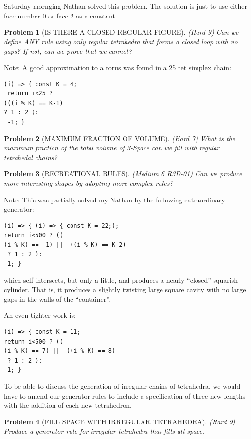 \documentclass[11pt]{article}
\newtheorem{problem}{Problem}
\begin{document}
Saturday mornging Nathan solved this problem. The solution is just to use either face number $0$ or face $2$ as a constant.

\begin{problem}[IS THERE A CLOSED REGULAR FIGURE]
(Hard 9) Can we define ANY rule using only regular tetrahedra that forms a closed loop with no gaps? If not, can we prove that we cannot?  
\end{problem}

Note: A good approximation to a torus was found in a 25 tet simplex chain:
\begin{verbatim}
(i) => { const K = 4;
 return i<25 ? 
(((i % K) == K-1) 
? 1 : 2 ):
 -1; }
\end{verbatim}


\begin{problem}[MAXIMUM FRACTION OF VOLUME]
(Hard 7) What is the maximum fraction of the total volume of 3-Space can we fill with regular tetrahedal chains?
\end{problem}

\begin{problem}[RECREATIONAL RULES]
(Medium 6 R3D-01) Can we produce more interesting shapes by adopting more complex rules?  
\end{problem}

Note: This was partially solved my Nathan by the following extraordinary generator:
\begin{verbatim}
(i) => { (i) => { const K = 22;);
return i<500 ? ((
(i % K) == -1) ||  ((i % K) == K-2) 
 ? 1 : 2 ): 
-1; }
\end{verbatim}
which self-intersects, but only a little, and produces a nearly ``closed'' squarish cylinder. That is, it produces a slightly twisting large square
cavity with no large gaps in the walls of the ``container''.

An even tighter work is:
\begin{verbatim}
(i) => { const K = 11;
return i<500 ? ((
(i % K) == 7) ||  ((i % K) == 8) 
 ? 1 : 2 ): 
-1; }
\end{verbatim}

To be able to discuss the generation of irregular chains of tetrahedra, we would have to amend our generator rules to include a specification
of three new lengths with the addition of each new tetrahedron.

\begin{problem}[FILL SPACE WITH IRREGULAR TETRAHEDRA]
(Hard 9) Produce a generator rule for irregular tetrahedra that fills all space.
\end{problem}
\end{document}
